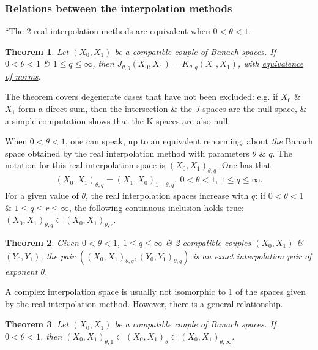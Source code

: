 \documentclass[oneside]{book}
\numberwithin{equation}{section}
\newtheorem{theorem}{Theorem}[chapter]
\begin{document}
\subsubsection{Relations between the interpolation methods}
``The 2 real interpolation methods are equivalent when $0 < \theta < 1$.

\begin{theorem}
	Let $(X_0,X_1)$ be a compatible couple of Banach spaces. If $0 < \theta < 1$ \& $1\le q\le\infty$, then $J_{\theta,q}(X_0,X_1) = K_{\theta,q}(X_0,X_1)$, with \href{https://en.wikipedia.org/wiki/Norm_(mathematics)#Definition}{equivalence of norms}.
\end{theorem}
The theorem covers degenerate cases that have not been excluded: e.g. if $X_0$ \& $X_1$ form a direct sum, then the intersection \& the $J$-spaces are the null space, \& a simple computation shows that the K-spaces are also null.

When $0 < \theta < 1$, one can speak, up to an equivalent renorming, about \textit{the} Banach space obtained by the real interpolation method with parameters $\theta$ \& $q$. The notation for this real interpolation space is $(X_0,X_1)_{\theta,q}$. One has that
\begin{align*}
	(X_0,X_1)_{\theta,q} = (X_1,X_0)_{1-\theta,q},\ 0 < \theta < 1,\,1\le q\le\infty.
\end{align*}
For a given value of $\theta$, the real interpolation spaces increase with $q$: if $0 < \theta < 1$ \& $1\le q\le r\le\infty$, the following continuous inclusion holds true: $(X_0,X_1)_{\theta,q}\subset(X_0,X_1)_{\theta,r}$.

\begin{theorem}
	Given $0 < \theta < 1$, $1\le q\le\infty$ \& 2 compatible couples $(X_0,X_1)$ \& $(Y_0,Y_1)$, the pair $((X_0,X_1)_{\theta,q},(Y_0,Y_1)_{\theta,q})$ is an exact interpolation pair of exponent $\theta$.
\end{theorem}
A complex interpolation space is usually not isomorphic to 1 of the spaces given by the real interpolation method. However, there is a general relationship.

\begin{theorem}
	Let $(X_0,X_1)$ be a compatible couple of Banach spaces. If $0 < \theta < 1$, then $(X_0,X_1)_{\theta,1}\subset(X_0,X_1)_\theta\subset(X_0,X_1)_{\theta,\infty}$.
\end{theorem}
\end{document}

